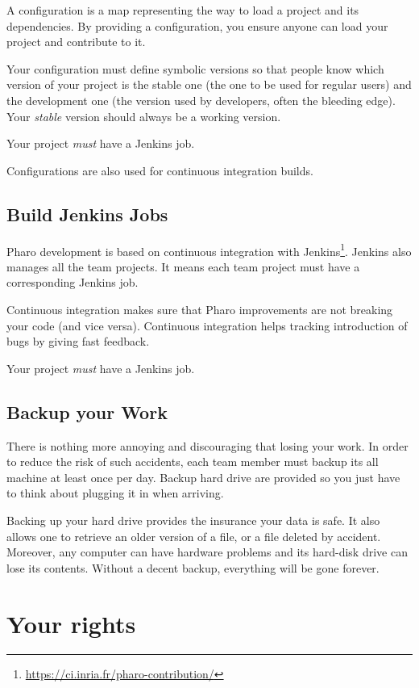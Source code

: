 \documentclass[10pt]{article}
\begin{document}
A configuration is a map representing the way to load a project and its dependencies.
By providing a configuration, you ensure anyone can load your project and contribute to it.

Your configuration must define symbolic versions so that people know which version of your project is the stable one (the one to be used for regular users) and the development one (the version used by developers, often the bleeding edge). Your \emph{stable} version should always be a working version.

Your project \emph{must} have a Jenkins job.

Configurations are also used for continuous integration builds.

\subsection{Build Jenkins Jobs}

Pharo development is based on continuous integration with Jenkins\footnote{\url{https://ci.inria.fr/pharo-contribution/}}. Jenkins also manages all the team projects. It means each team project must have a corresponding Jenkins job.

Continuous integration makes sure that Pharo improvements are not breaking your code (and vice versa). Continuous integration helps tracking introduction of bugs by giving fast feedback.

Your project \emph{must} have a Jenkins job.

\subsection{Backup your Work}

There is nothing more annoying and discouraging that losing your work. In order to reduce the risk of such accidents, each team member must backup its all machine at least once per day. Backup hard drive are provided so you just have to think about plugging it in when arriving.

Backing up your hard drive provides the insurance your data is safe. It also allows one to retrieve an older version of a file, or a file deleted by accident.
Moreover, any computer can have hardware problems and its hard-disk drive can lose its contents. Without a decent backup, everything will be gone forever.

\section{Your rights}
\end{document}
